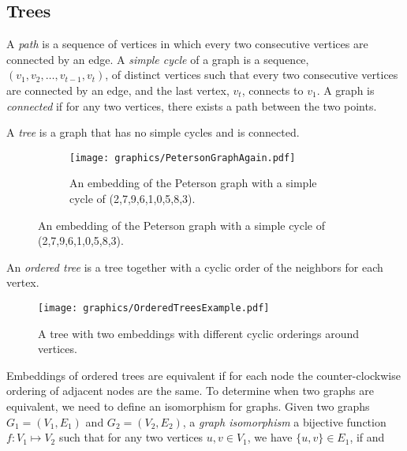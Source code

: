 \subsection{Trees}
A \textit{path} is a sequence of vertices in which every two consecutive vertices are connected by 
an edge.   
A \textit{simple  cycle} of a graph is a sequence, $(v_1, v_2, \dots, v_{t-1},v_t)$, of 
distinct vertices such that every two consecutive vertices are connected by 
an edge,  and the last vertex, $v_t$, connects to $v_1$.  A 
graph is \textit{connected} if for any two vertices, there exists a path between 
the two points.

A \textit{tree} is a graph that has no simple cycles and is connected.
\begin{figure}[h]
\begin{center}
  \begin{subfigure}[b]{0.49\textwidth}
    \texttt{[image: graphics/PetersonGraphAgain.pdf]}
    \caption{An embedding of the Peterson graph with a simple cycle of 
    (2,7,9,6,1,0,5,8,3).}\label{fig:ch1-graph-2}
  \end{subfigure}
  
\end{center}
\end{figure}
An \textit{ordered tree} is a tree together with a cyclic order of the neighbors for each vertex.
\begin{figure}[h]
\begin{center}
    \texttt{[image: graphics/OrderedTreesExample.pdf]}
    \caption{A tree with two embeddings with different cyclic orderings around 
vertices.}\label{fig:ch1-graph-6}
\end{center}
\end{figure}
Embeddings of ordered trees are equivalent if for each node the counter-clockwise ordering of 
adjacent nodes are the same.
To determine when two graphs are equivalent, we need to define an isomorphism for graphs.  Given 
two graphs $G_1 =(V_1,E_1)$ and $G_2 = (V_2,E_2) $, a \textit{graph isomorphism} a bijective 
function $f: V_1 \mapsto 
V_2$ 
such that for any two vertices $u,v \in V_1$, we have $\{u, v\} \in E_1$, if and 

